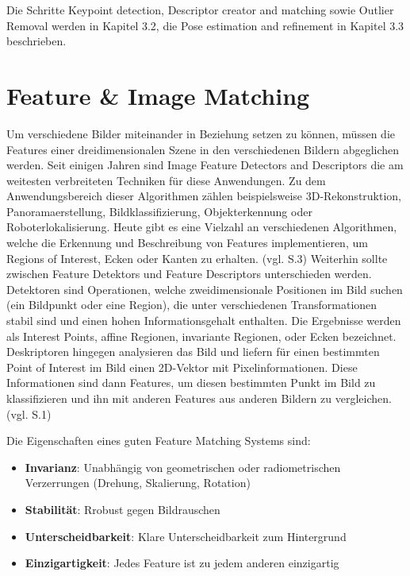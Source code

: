 Die Schritte \glqq Keypoint detection\grqq{}, \glqq  Descriptor creator and matching\grqq{} sowie \glqq Outlier Removal\grqq{} werden in Kapitel 3.2, die \glqq Pose estimation and refinement\grqq{} in Kapitel 3.3 beschrieben.


\section{Feature \& Image Matching}

Um verschiedene Bilder miteinander in Beziehung setzen zu können, müssen die Features einer dreidimensionalen Szene in den verschiedenen Bildern abgeglichen werden. Seit einigen Jahren sind \glqq Image Feature Detectors and Descriptors\grqq{} die am weitesten verbreiteten Techniken für diese Anwendungen. Zu dem Anwendungsbereich dieser Algorithmen zählen beispielsweise 3D-Rekonstruktion, Panoramaerstellung, Bildklassifizierung, Objekterkennung oder Roboterlokalisierung. Heute gibt es eine Vielzahl an verschiedenen Algorithmen, welche die Erkennung und Beschreibung von Features implementieren, um \glqq Regions of Interest\grqq{}, Ecken oder Kanten zu erhalten. (vgl. \cite{robust_feature} S.3) Weiterhin sollte zwischen \glqq Feature Detektors\grqq{} und \glqq Feature Descriptors\grqq{} unterschieden werden. Detektoren sind Operationen, welche zweidimensionale Positionen im Bild suchen (ein Bildpunkt oder eine Region), die unter verschiedenen Transformationen stabil sind und einen hohen Informationsgehalt enthalten. Die Ergebnisse werden als \glqq Interest Points\grqq{}, affine Regionen, invariante Regionen, oder Ecken bezeichnet. Deskriptoren hingegen analysieren das Bild und liefern für einen bestimmten \glqq Point of Interest\grqq{} im Bild einen 2D-Vektor mit Pixelinformationen. Diese Informationen sind dann Features, um diesen bestimmten Punkt im Bild zu klassifizieren und ihn mit anderen Features aus anderen Bildern zu vergleichen. (vgl. \cite{det_des} S.1)


Die Eigenschaften eines guten Feature Matching Systems sind: 

\begin{itemize}
\item \textbf{Invarianz}: Unabhängig von geometrischen oder radiometrischen Verzerrungen (Drehung, Skalierung, Rotation)
\item \textbf{Stabilität}: Rrobust gegen Bildrauschen
\item \textbf{Unterscheidbarkeit}: Klare Unterscheidbarkeit zum Hintergrund
\item \textbf{Einzigartigkeit}: Jedes Feature ist zu jedem anderen einzigartig
\end{itemize}

